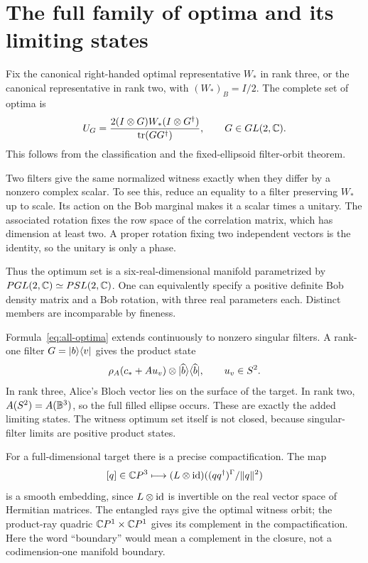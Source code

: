 \section{The full family of optima and its limiting states}

Fix the canonical right-handed optimal representative $W_*$ in rank three, or the canonical representative in rank two, with $(W_*)_B=I/2$. The complete set of optima is
\begin{equation}\label{eq:all-optima}
 U_G=\frac{2(I\otimes G)W_*(I\otimes G^\dagger)}{\operatorname{tr}(GG^\dagger)},
 \qquad G\in GL(2,\mathbb C).
\end{equation}
This follows from the classification and the fixed-ellipsoid filter-orbit theorem.

Two filters give the same normalized witness exactly when they differ by a nonzero complex scalar. To see this, reduce an equality to a filter preserving $W_*$ up to scale. Its action on the Bob marginal makes it a scalar times a unitary. The associated rotation fixes the row space of the correlation matrix, which has dimension at least two. A proper rotation fixing two independent vectors is the identity, so the unitary is only a phase.

Thus the optimum set is a six-real-dimensional manifold parametrized by $PGL(2,\mathbb C)\simeq PSL(2,\mathbb C)$. One can equivalently specify a positive definite Bob density matrix and a Bob rotation, with three real parameters each. Distinct members are incomparable by fineness.

Formula~\eqref{eq:all-optima} extends continuously to nonzero singular filters. A rank-one filter $G=\lvert b\rangle\langle v\rvert$ gives the product state
\[
 \rho_A(c_*+A u_v)\otimes\lvert \widehat b\rangle\langle \widehat b\rvert,\qquad u_v\in S^2.
\]
In rank three, Alice's Bloch vector lies on the surface of the target. In rank two, $A(S^2)=A(\mathbb B^3)$, so the full filled ellipse occurs. These are exactly the added limiting states. The witness optimum set itself is not closed, because singular-filter limits are positive product states.

For a full-dimensional target there is a precise compactification. The map
\[
 [q]\in\mathbb C P^3\longmapsto
 (L\otimes\operatorname{id})((qq^\dagger)^\Gamma/\|q\|^2)
\]
is a smooth embedding, since $L\otimes\operatorname{id}$ is invertible on the real vector space of Hermitian matrices. The entangled rays give the optimal witness orbit; the product-ray quadric $\mathbb C P^1\times\mathbb C P^1$ gives its complement in the compactification. Here the word ``boundary'' would mean a complement in the closure, not a codimension-one manifold boundary.

